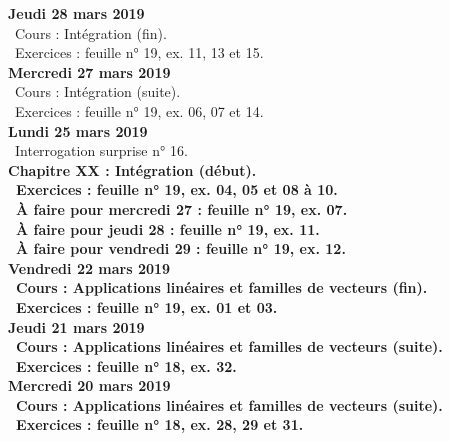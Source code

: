 \documentclass[12pt,a4paper]{article}
\begin{document}
\noindent\textbf{Jeudi 28 mars 2019}\\
\bu\ Cours : Intégration (fin).\\
\bu\ Exercices : feuille n° 19, ex. 11, 13 et 15.\vspace{.4cm}\\

\noindent\textbf{Mercredi 27 mars 2019} \\
\bu\ Cours : Intégration (suite).\\
\bu\ Exercices : feuille n° 19, ex. 06, 07 et 14.\vspace{.4cm}\\

\noindent\textbf{\bf Lundi 25 mars 2019} \\
\bu\ Interrogation surprise n° 16.\\
\bf Chapitre XX \rm : Intégration (début).\vspace{.4cm}\\
\bu\ Exercices : feuille n° 19, ex. 04, 05 et 08 à 10.\\
\bu\ À faire pour mercredi 27 : feuille n° 19, ex. 07.\\
\bu\ À faire pour jeudi 28 : feuille n° 19, ex. 11.\\
\bu\ À faire pour vendredi 29 : feuille n° 19, ex. 12.\vspace{.4cm}\\

\noindent\textbf{\bf Vendredi 22 mars 2019} \\
\bu\ Cours : Applications linéaires et familles de vecteurs (fin).\\
\bu\ Exercices : feuille n° 19, ex. 01 et 03.\vspace{.4cm}\\

\noindent\textbf{Jeudi 21 mars 2019}\\
\bu\ Cours : Applications linéaires et familles de vecteurs (suite).\\
\bu\ Exercices : feuille n° 18, ex. 32.\vspace{.4cm}\\

\noindent\textbf{Mercredi 20 mars 2019} \\
\bu\ Cours : Applications linéaires et familles de vecteurs (suite).\\
\bu\ Exercices : feuille n° 18, ex. 28, 29 et 31.\vspace{.4cm}\\
\end{document}
